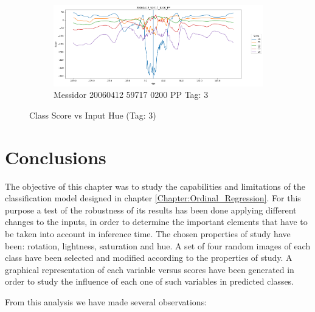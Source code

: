 \begin{figure}[ht!]
\begin{subfigure}[b]{ 0.85\textwidth}
		\centering
		\includegraphics[width=\textwidth]{Figures/chapter_stability/20060412_59717_0200_PP/h/scores.png}
		\caption{Messidor 20060412 59717 0200 PP Tag: 3}		
	\end{subfigure}
	\hfill 
	\caption[Score vs Hue (Tag: 3)]{Class Score vs Input Hue (Tag: 3)}  
	\label{sta:fig:hue3} 
\end{figure}

\section{Conclusions}

The objective of this chapter was to study the capabilities and limitations of the classification model designed in chapter \ref{Chapter:Ordinal_Regression}. For this purpose a test of the robustness of its results has been done applying different changes to the inputs, in order to determine the important elements that have to be taken into account in inference time. The chosen properties of study have been: rotation, lightness, saturation and hue. A set of four random images of each class have been selected and modified according to the properties of study. A graphical representation of each variable versus scores have been generated in order to study the influence of each one of such variables in predicted classes.

From this analysis we have made several observations:

